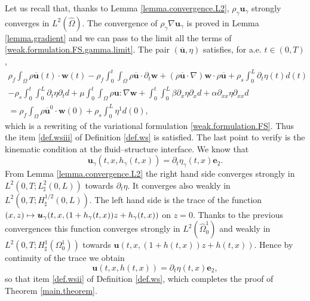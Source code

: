 \documentclass[11pt]{article}
\newcommand\mto{\mathchoice{\longmapsto}{\mapsto}{\mapsto}{\mapsto}}
\theoremstyle{remark}
\theoremstyle{definition}
\newcommand{\ug}{\boldsymbol{u}}
\newcommand{\wg}{\boldsymbol{w}}
\newcommand{\BS}[1]{\boldsymbol{#1}}
\let\CM\Omega
\begin{document}
Let us recall that, thanks to Lemma \ref{lemma.convergence.L2}, $\rho_\gamma \ug_{\gamma}$ strongly converges in $L^2(\hat\Omega)$. The convergence of $\rho_{\gamma} \nabla\ug_{\gamma}$ is proved in Lemma \ref{lemma.gradient} and we can pass to the limit all the terms of \eqref{weak.formulation.FS.gamma.limit}. The pair $(\overline{\ug},\eta)$ satisfies, for a.e. $t\in(0,T)$,
\begin{multline*}
\rho_{f}\int_{\CM}\rho\overline{\ug}(t)\cdot\wg(t) -\rho_{f}\int_{0}^{t}\int_{\CM}\rho\overline{\ug}\cdot\partial_{t}\wg + (\rho\overline{\ug}\cdot\nabla)\wg\cdot\rho\overline{\ug}+\rho_{s}\int_{0}^{L}\partial_{t}\eta(t)d(t)\\
-\rho_{s}\int_{0}^{t}\int_{0}^{L}\partial_{t}\eta\partial_{t}d+\mu\int_{0}^{t}\int_{\CM}\rho \ug:\nabla\wg
+\int_{0}^{t}\int_{0}^{L}\beta\partial_{x}\eta\partial_{x}d + \alpha\partial_{xx}\eta\partial_{xx}d\\
=\rho_{f}\int_{\CM}\rho\overline{\ug}^{0}\cdot\wg(0)+\rho_{s}\int_{0}^{L}\eta^{1}d(0),
\end{multline*}
which is a rewriting of the variational formulation \eqref{weak.formulation.FS}. Thus the item \eqref{def.wsiii} of Definition \ref{def.ws} is satisfied.
The last point to verify is the kinematic condition at the fluid--structure interface. We know that
\[
\ug_\gamma(t, x, h_\gamma(t, x))= \partial_t \eta_\gamma(t, x) \BS{e}_2.
\]
From Lemma \ref{lemma.convergence.L2} the right hand side converges strongly in $L^2(0, T; L_\sharp^2(0, L))$ towards $\partial_t \eta$. It converges also weakly in $L^2(0, T; H_\sharp^{1/2}(0, L))$. The left hand side is the trace of the function $(x, z) \mto \ug_\gamma(t, x, (1+h_\gamma(t, x))z + h_\gamma(t, x))$ on $z=0$. Thanks to the previous convergences this function converges strongly in $L^2(\widehat{\Omega}_0^1)$ and weakly in $L^2(0, T; H^1_\sharp(\Omega_0^1))$ towards $\ug(t, x, (1+h(t, x))z + h(t, x))$. Hence by continuity of the trace we obtain
\[
\ug(t, x, h(t, x))= \partial_t \eta(t, x) \BS{e}_2,
\]
so that item \eqref{def.wsii} of Definition \ref{def.ws}, which completes the proof of Theorem \ref{main.theorem}.
\end{document}
